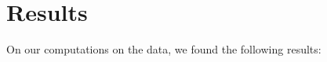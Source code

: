 \documentclass[fontsize=11pt]{article}
\begin{document}

    \newpage
    \section*{Results}
    On our computations on the data, we found the following results:\\
\end{document}
